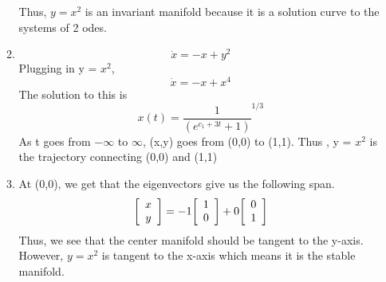 \documentclass[a4paper]{article}
\newenvironment{mat}{\left[ \begin{array}{ccccccccccccc}}{\end{array}\right]}
\newcommand\bcm{\begin{mat}}
\newcommand\ecm{\end{mat}}
\begin{document}
\begin{enumerate}
\begin{enumerate}
	Thus, $y =x^2$ is an invariant manifold because it is a solution curve to the systems of 2 odes.
	\item
	\[\dot{x}= -x +y^2\]
	Plugging in y = $x^2$,
	\[\dot{x}= -x +x^4\]
	The solution to this is 
	\[x(t) = {\frac{1}{(e^{c_1 + 3 t} + 1)}}^{1/3}\]
	As t goes from $-\infty$ to $\infty$, (x,y) goes from (0,0) to (1,1). Thus , y = $x^2$ is the trajectory connecting (0,0) and (1,1)
	
	\item 
	At (0,0), we get that the eigenvectors give us the following span.
	\[\bcm x \\ y\ecm = -1 \bcm 1 \\0 \ecm + 0 \bcm 0 \\1 \ecm \]
	Thus, we see that the center manifold should be tangent to the y-axis. 
	However, $y = x^2$ is tangent to the x-axis which means it is the stable manifold.
	
\end{enumerate}
	\end{enumerate} 
\end{document}

